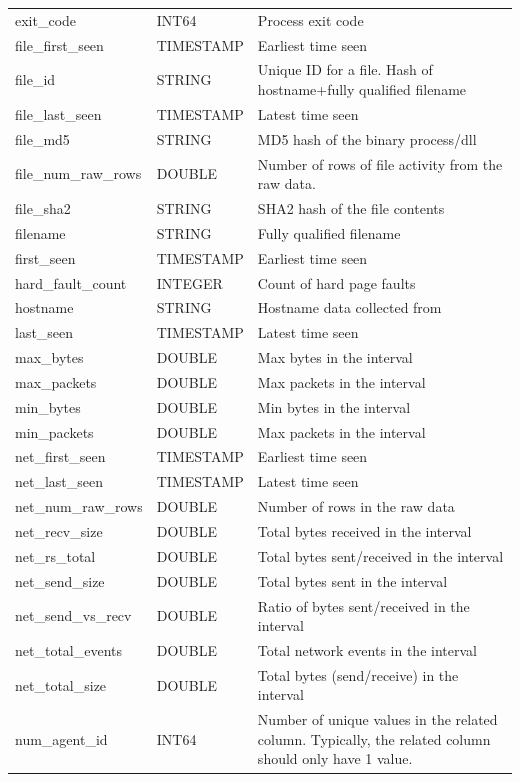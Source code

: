\documentclass[conference,compsoc]{IEEEtran}
\begin{document}
\begin{longtable}{|p{5cm}|p{2cm}|p{9cm}|}
exit\_code & INT64 & Process exit code \\
file\_first\_seen & TIMESTAMP & Earliest time seen \\
file\_id & STRING & Unique ID for a file. Hash of hostname+fully qualified filename \\
file\_last\_seen & TIMESTAMP & Latest time seen \\
file\_md5 & STRING & MD5 hash of the binary process/dll \\
file\_num\_raw\_rows & DOUBLE & Number of rows of file activity from the raw data. \\
file\_sha2 & STRING & SHA2 hash of the file contents \\
filename & STRING & Fully qualified filename \\
first\_seen & TIMESTAMP & Earliest time seen \\
hard\_fault\_count & INTEGER & Count of hard page faults \\
hostname & STRING & Hostname data collected from \\
last\_seen & TIMESTAMP & Latest time seen \\
max\_bytes & DOUBLE & Max bytes in the interval \\
max\_packets & DOUBLE & Max packets in the interval \\
min\_bytes & DOUBLE & Min bytes in the interval \\
min\_packets & DOUBLE & Max packets in the interval \\
net\_first\_seen & TIMESTAMP & Earliest time seen \\
net\_last\_seen & TIMESTAMP & Latest time seen \\
net\_num\_raw\_rows & DOUBLE & Number of rows in the raw data \\
net\_recv\_size & DOUBLE & Total bytes received in the interval \\
net\_rs\_total & DOUBLE & Total bytes sent/received in the interval \\
net\_send\_size & DOUBLE & Total bytes sent in the interval \\
net\_send\_vs\_recv & DOUBLE & Ratio of bytes sent/received in the interval \\
net\_total\_events & DOUBLE & Total network events in the interval \\
net\_total\_size & DOUBLE & Total bytes (send/receive) in the interval \\
num\_agent\_id & INT64 & Number of unique values in the related column. Typically, the related column should only have 1 value. \\

\end{longtable}
\end{document}
